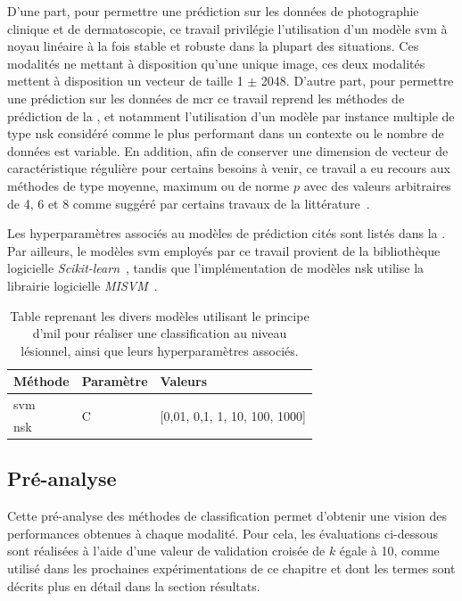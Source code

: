 D'une part, pour permettre une prédiction sur les données de photographie clinique et de dermatoscopie, ce travail privilégie l'utilisation d'un modèle \gls{svm} à noyau linéaire à la fois stable et robuste dans la plupart des situations. Ces modalités ne mettant à disposition qu’une unique image, ces deux modalités mettent à disposition un vecteur de taille 1 $\pm$ 2048. D'autre part, pour permettre une prédiction sur les données de \gls{mcr} ce travail reprend les méthodes de prédiction de la , et notamment l'utilisation d'un modèle par instance multiple de type \gls{nsk} considéré comme le plus performant dans un contexte ou le nombre de données est variable. En addition, afin de conserver une dimension de vecteur de caractéristique régulière pour certains besoins à venir, ce travail a eu recours aux méthodes de type moyenne, maximum ou de norme $p$ avec des valeurs arbitraires de 4, 6 et 8 comme suggéré par certains travaux de la littérature~\cite{Li2016,Xu2017}.\par

Les hyperparamètres associés au modèles de prédiction cités sont listés dans la . Par ailleurs, le modèles \gls{svm} employés par ce travail provient de la bibliothèque logicielle \textit{Scikit-learn}~\cite{pedregosa2011}, tandis que l'implémentation de modèles \gls{nsk} utilise la librairie logicielle \textit{MISVM}~\cite{Doran2014}.\par
\begin{table}[H]
    \centering
    \begin{tabular}{lll}
    \toprule
    \textbf{Méthode}    & \textbf{Paramètre}& \textbf{Valeurs}                                  \\ \midrule
    \gls{svm}           & \multirow{2}{*}{C}& \multirow{2}{*}{[0,01, 0,1, 1, 10, 100, 1000]}    \\ \cline{1-1}
    \gls{nsk}           &                   &                                                   \\ \bottomrule 
    \end{tabular}    
    \caption{Table reprenant les divers modèles utilisant le principe d'\gls{mil} pour réaliser une classification au niveau lésionnel, ainsi que leurs hyperparamètres associés.}
    \label{tab:multimodal_models_parameters}
\end{table}\par
\clearpage

\subsection{Pré-analyse}
Cette pré-analyse des méthodes de classification permet d'obtenir une vision des performances obtenues à chaque modalité. Pour cela, les évaluations ci-dessous sont réalisées à l'aide d'une valeur de validation croisée de $k$ égale à 10, comme utilisé dans les prochaines expérimentations de ce chapitre et dont les termes sont décrits plus en détail dans la section résultats.\par

